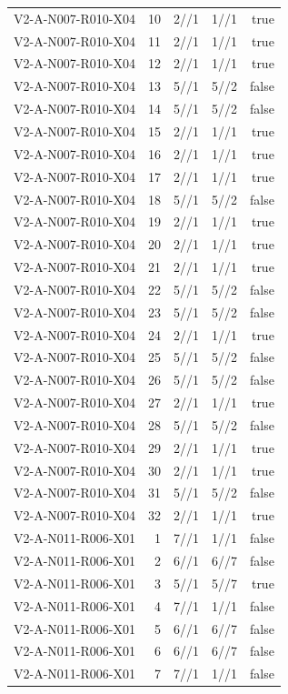 {\begin{longtable}{lrrrr}
V2-A-N007-R010-X04 & 10 & 2//1 & 1//1 & true \\
V2-A-N007-R010-X04 & 11 & 2//1 & 1//1 & true \\
V2-A-N007-R010-X04 & 12 & 2//1 & 1//1 & true \\
V2-A-N007-R010-X04 & 13 & 5//1 & 5//2 & false \\
V2-A-N007-R010-X04 & 14 & 5//1 & 5//2 & false \\
V2-A-N007-R010-X04 & 15 & 2//1 & 1//1 & true \\
V2-A-N007-R010-X04 & 16 & 2//1 & 1//1 & true \\
V2-A-N007-R010-X04 & 17 & 2//1 & 1//1 & true \\
V2-A-N007-R010-X04 & 18 & 5//1 & 5//2 & false \\
V2-A-N007-R010-X04 & 19 & 2//1 & 1//1 & true \\
V2-A-N007-R010-X04 & 20 & 2//1 & 1//1 & true \\
V2-A-N007-R010-X04 & 21 & 2//1 & 1//1 & true \\
V2-A-N007-R010-X04 & 22 & 5//1 & 5//2 & false \\
V2-A-N007-R010-X04 & 23 & 5//1 & 5//2 & false \\
V2-A-N007-R010-X04 & 24 & 2//1 & 1//1 & true \\
V2-A-N007-R010-X04 & 25 & 5//1 & 5//2 & false \\
V2-A-N007-R010-X04 & 26 & 5//1 & 5//2 & false \\
V2-A-N007-R010-X04 & 27 & 2//1 & 1//1 & true \\
V2-A-N007-R010-X04 & 28 & 5//1 & 5//2 & false \\
V2-A-N007-R010-X04 & 29 & 2//1 & 1//1 & true \\
V2-A-N007-R010-X04 & 30 & 2//1 & 1//1 & true \\
V2-A-N007-R010-X04 & 31 & 5//1 & 5//2 & false \\
V2-A-N007-R010-X04 & 32 & 2//1 & 1//1 & true \\
V2-A-N011-R006-X01 & 1 & 7//1 & 1//1 & false \\
V2-A-N011-R006-X01 & 2 & 6//1 & 6//7 & false \\
V2-A-N011-R006-X01 & 3 & 5//1 & 5//7 & true \\
V2-A-N011-R006-X01 & 4 & 7//1 & 1//1 & false \\
V2-A-N011-R006-X01 & 5 & 6//1 & 6//7 & false \\
V2-A-N011-R006-X01 & 6 & 6//1 & 6//7 & false \\
V2-A-N011-R006-X01 & 7 & 7//1 & 1//1 & false \\

\end{longtable}}
